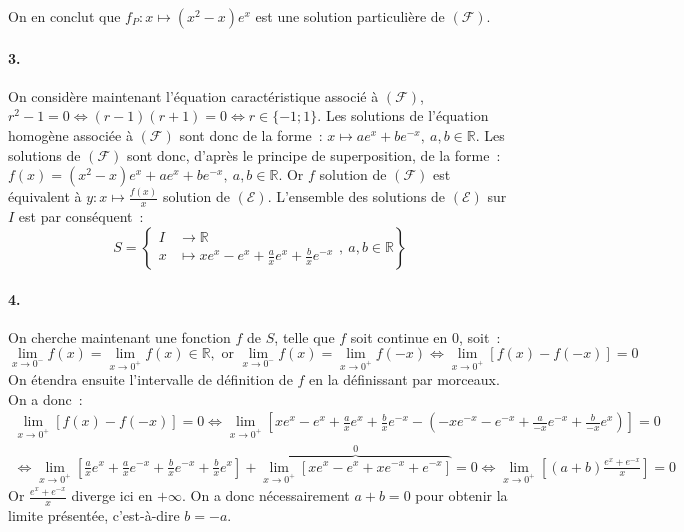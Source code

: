 \documentclass{article}
\begin{document}
    On en conclut que $f_P\colon x\mapsto \left(x^2-x\right)e^x$ est une solution particulière de $(\mathscr{F})$.

    \paragraph{3.} On considère maintenant l'équation caractéristique associé à $(\mathscr{F})$, $r^2-1=0 \iff (r-1)(r+1)=0 \iff r\in\{-1;1\}$. Les solutions de l'équation homogène associée à $(\mathscr{F})$ sont donc de la forme~: $x\mapsto ae^x+be^{-x},\ a,b\in\mathbb{R}$. Les solutions de $(\mathscr{F})$ sont donc, d'après le principe de superposition, de la forme~: $f(x)=\left(x^2-x\right)e^x+ae^x+be^{-x},\ a,b\in\mathbb{R}$. Or $f$ solution de $(\mathscr{F})$ est équivalent à $y\colon x\mapsto\frac{f(x)}{x}$ solution de $(\mathscr{E})$. L'ensemble des solutions de $(\mathscr{E})$ sur $I$ est par conséquent~:
    \begin{displaymath}
      S=\left\{
        \begin{array}{rl}
          I\!&\longrightarrow\mathbb{R} \\
          x\!&\longmapsto xe^x -e^x + \frac{a}{x}e^x+\frac{b}{x}e^{-x}
        \end{array}
        ,\ a,b\in\mathbb{R}
        \right\}
    \end{displaymath}

    \paragraph{4.}
    On cherche maintenant une fonction $f$ de $S$, telle que $f$ soit continue en 0, soit~:
    \begin{displaymath}
      \lim_{x\to 0^-}f(x)=\lim_{x\to 0^+}f(x)\in\mathbb{R},\text{ or }\lim_{x\to 0^-}f(x)=\lim_{x\to 0^+}f(-x) \iff \lim_{x\to 0^+}\left[f(x)-f(-x)\right]=0
    \end{displaymath}
    On étendra ensuite l'intervalle de définition de $f$ en la définissant par morceaux. On a donc~:
    \begin{align*}
      \lim_{x\to 0^+}\left[f(x)-f(-x)\right]=0 \iff \lim_{x\to 0^+}\left[xe^x -e^x + \frac{a}{x}e^x+\frac{b}{x}e^{-x} - \left(-xe^{-x} -e^{-x} + \frac{a}{-x}e^{-x}+\frac{b}{-x}e^{x}\right)\right]=0 \\
      \iff \lim_{x\to 0^+}\left[\frac{a}{x}e^x + \frac{a}{x}e^{-x} + \frac{b}{x}e^{-x} + \frac{b}{x}e^x\right] + \overbrace{\lim_{x\to 0^+}\left[xe^x-e^x+xe^{-x}+e^{-x}\right]}^{0} = 0 \iff \lim_{x\to 0^+}\left[(a+b)\frac{e^x+e^{-x}}{x}\right]=0
    \end{align*}
    Or $\frac{e^x+e^{-x}}{x}$ diverge ici en $+\infty$. On a donc nécessairement $a+b=0$ pour obtenir la limite présentée, c'est-à-dire $b=-a$.
\end{document}
